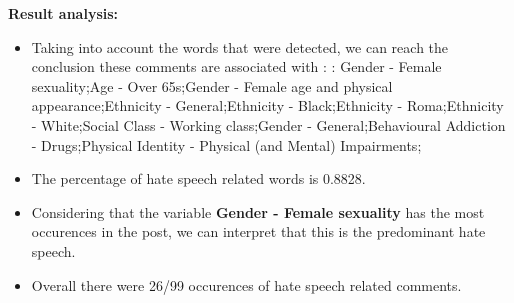 \documentclass[11pt]{article}
\begin{document}
\textbf{\Large Result analysis:}

\begin{itemize}\item Taking into account the words that were detected, we can reach the conclusion these comments are associated with : : Gender - Female sexuality;Age - Over 65s;Gender - Female age and physical appearance;Ethnicity - General;Ethnicity - Black;Ethnicity - Roma;Ethnicity - White;Social Class - Working class;Gender - General;Behavioural Addiction - Drugs;Physical Identity - Physical (and Mental) Impairments;%

\item The percentage of hate speech related words is 0.8828.

\item Considering that the variable \textbf{Gender - Female sexuality} has the most occurences in the post, we can interpret that this is the predominant hate speech.

\item Overall there were 26/99 occurences of hate speech related comments.\end{itemize}
\end{document}

